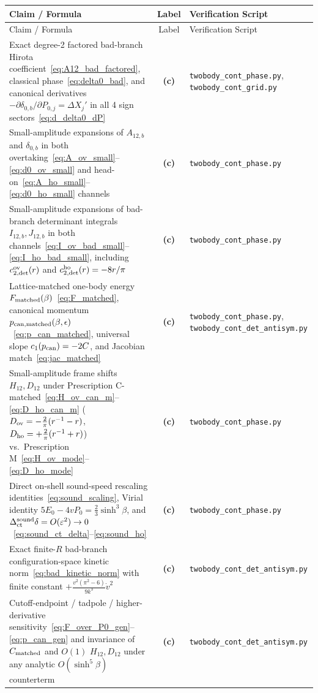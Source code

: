 \documentclass[11pt,a4paper]{article}
\newcommand{\Lc}{\textbf{(c)}}
\newcommand{\script}[1]{\texttt{#1}}
\begin{document}
\begin{longtable}{@{}p{}cp{}@{}}
\toprule
Claim / Formula & Label & Verification Script \\
\midrule
\endfirsthead
\toprule
Claim / Formula & Label & Verification Script \\
\midrule
\endhead
\bottomrule
\endfoot
Exact degree-2 factored bad-branch Hirota coefficient~\eqref{eq:A12_bad_factored}, classical phase~\eqref{eq:delta0_bad}, and canonical derivatives $-\partial\delta_{0,b}/\partial P_{0,j}=\Delta X_j'$ in all 4 sign sectors~\eqref{eq:d_delta0_dP} & \Lc & \script{twobody\_cont\_phase.py}, \script{twobody\_cont\_grid.py} \\
Small-amplitude expansions of $A_{12,b}$ and $\delta_{0,b}$ in both overtaking~\eqref{eq:A_ov_small}--\eqref{eq:d0_ov_small} and head-on~\eqref{eq:A_ho_small}--\eqref{eq:d0_ho_small} channels & \Lc & \script{twobody\_cont\_phase.py} \\
Small-amplitude expansions of bad-branch determinant integrals $I_{12,b},J_{12,b}$ in both channels~\eqref{eq:I_ov_bad_small}--\eqref{eq:I_ho_bad_small}, including $c_{2,\rm det}^{\rm ov}(r)$ and $c_{2,\rm det}^{\rm ho}(r)=-8r/\pi$ & \Lc & \script{twobody\_cont\_phase.py} \\
Lattice-matched one-body energy $F_{\rm matched}(\beta)$~\eqref{eq:F_matched}, canonical momentum $p_{\rm can,matched}(\beta,\epsilon)$~\eqref{eq:p_can_matched}, universal slope $c_1(p_{\rm can})=-2C$, and Jacobian match~\eqref{eq:jac_matched} & \Lc & \script{twobody\_cont\_phase.py}, \script{twobody\_cont\_det\_antisym.py} \\
Small-amplitude frame shifts $H_{12},D_{12}$ under Prescription C-matched~\eqref{eq:H_ov_can_m}--\eqref{eq:D_ho_can_m} ($D_{\rm ov}=-\frac{2}{\pi}(r^{-1}-r)$, $D_{\rm ho}=+\frac{2}{\pi}(r^{-1}+r)$) vs.\ Prescription M~\eqref{eq:H_ov_mode}--\eqref{eq:D_ho_mode} & \Lc & \script{twobody\_cont\_phase.py} \\
Direct on-shell sound-speed rescaling identities~\eqref{eq:sound_scaling}, Virial identity $5E_0-4vP_0=\frac23\sinh^3\beta$, and $\Delta_{\rm ct}^{\rm sound}\delta=O(\varepsilon^2)\to 0$~\eqref{eq:sound_ct_delta}--\eqref{eq:sound_ho} & \Lc & \script{twobody\_cont\_phase.py} \\
Exact finite-$R$ bad-branch configuration-space kinetic norm~\eqref{eq:bad_kinetic_norm} with finite constant $+\frac{v^2(\pi^2-6)}{9k^3}\dot v^2$ & \Lc & \script{twobody\_cont\_det\_antisym.py} \\
Cutoff-endpoint / tadpole / higher-derivative sensitivity~\eqref{eq:F_over_P0_gen}--\eqref{eq:p_can_gen} and invariance of $C_{\rm matched}$ and $O(1)$ $H_{12},D_{12}$ under any analytic $O(\sinh^5\beta)$ counterterm & \Lc & \script{twobody\_cont\_det\_antisym.py} \\

\end{longtable}
\end{document}
